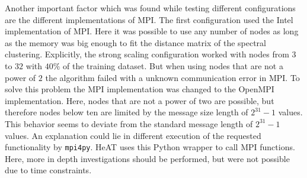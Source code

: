 Another important factor which was found while testing different configurations are the different implementations of \gls{MPI}.
The first configuration used the Intel implementation of \gls{MPI}. Here it was possible to use any number of nodes as long as
the memory was big enough to fit the distance matrix of the spectral clustering. Explicitly, the strong scaling configuration worked
with nodes from \(3\) to \(32\) with \(40\%\) of the training dataset.
But when using nodes that are not a power of \(2\) the algorithm failed with a unknown communication error in \gls{MPI}.
To solve this problem the \gls{MPI} implementation was changed to the OpenMPI implementation.
Here, nodes that are not a power of two are possible, but therefore nodes below ten are limited by the message size length of \(2^{31} - 1\) values.
This behavior seems to deviate from the standard message length of \(2^{31} - 1\) values.
An explanation could lie in different execution of the requested functionality by \lstinline{mpi4py}.
\gls{HeAT} uses this Python wrapper to call \gls{MPI} functions.
Here, more in depth investigations should be performed, but were not possible due to time constraints.
